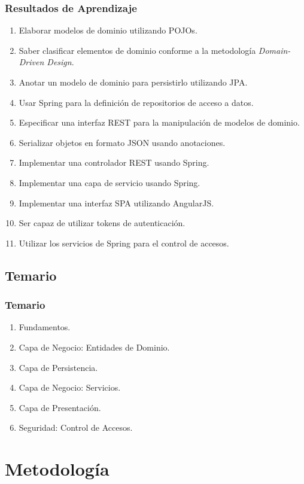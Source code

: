 \documentclass[a4paper,t,xcolor=pst,dvips,colortheme]{beamer}
\begin{document}
\begin{frame}[c]
   \frametitle{Resultados de Aprendizaje}
   \begin{enumerate}[<+->]
        \item Elaborar modelos de dominio utilizando POJOs.
        \item Saber clasificar elementos de dominio conforme a la metodología \emph{Domain-Driven Design}.
        \item Anotar un modelo de dominio para persistirlo utilizando JPA.
        \item Usar Spring para la definición de repositorios de acceso a datos.
        \item Especificar una interfaz REST para la manipulación de modelos de dominio.
        \item Serializar objetos en formato JSON usando anotaciones.
        \item Implementar una controlador REST usando Spring.
        \item Implementar una capa de servicio usando Spring.
        \item Implementar una interfaz SPA utilizando AngularJS.
        \item Ser capaz de utilizar tokens de autenticación.
        \item Utilizar los servicios de Spring para el control de accesos.
	\end{enumerate}
\end{frame}

\subsection{Temario}

\begin{frame}[c]
	\frametitle{Temario}
	\begin{enumerate}
		\item<1-> Fundamentos.
		\item<2-> Capa de Negocio: Entidades de Dominio.
		\item<3-> Capa de Persistencia.
		\item<4-> Capa de Negocio: Servicios.
		\item<5-> Capa de Presentación.
        \item<6-> Seguridad: Control de Accesos.
	\end{enumerate}
\end{frame}

\section{Metodología}
\end{document}
